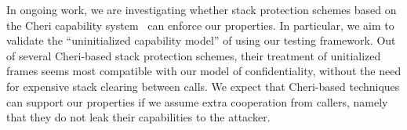 \documentclass[acmtog,review,anonymous]{acmart}\settopmatter{printfolios=true,printccs=false,printacmref=false}
\begin{document}
In ongoing work, we are investigating whether stack protection schemes
based on the Cheri capability system~\citep{Woodruff+14,Chisnall+15}
can enforce our properties.  In particular, we aim to validate
the ``uninitialized capability model'' of \citet{Georges+21} using
our testing framework. Out of several Cheri-based
stack protection schemes, their treatment of unitialized frames seems most compatible
with our model of confidentiality, without the need for expensive stack clearing
between calls. We expect that Cheri-based techniques can support our properties if we
assume extra cooperation from callers, namely that they do not leak their capabilities
to the attacker. %



\end{document}
